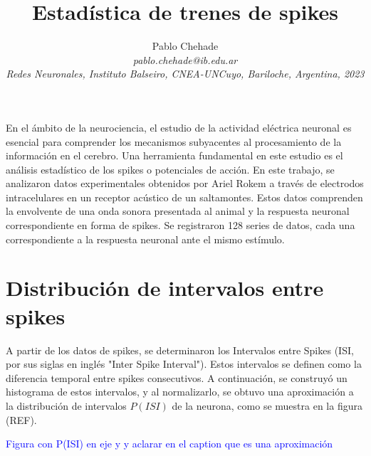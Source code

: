 \documentclass[aps,prb,twocolumn,superscriptaddress,floatfix,longbibliography]{revtex4-2}
\newcounter{para}
\begin{document}
\newcommand{\mytitle}{Estadística de trenes de spikes}

\title{\mytitle}

\author{Pablo Chehade \\
    \small \textit{pablo.chehade@ib.edu.ar} \\
    \small \textit{Redes Neuronales, Instituto Balseiro, CNEA-UNCuyo, Bariloche, Argentina, 2023} \\}
    
    
    
\maketitle

En el ámbito de la neurociencia, el estudio de la actividad eléctrica neuronal es esencial para comprender los mecanismos subyacentes al procesamiento de la información en el cerebro. Una herramienta fundamental en este estudio es el análisis estadístico de los spikes o potenciales de acción. En este trabajo, se analizaron datos experimentales obtenidos por Ariel Rokem a través de electrodos intracelulares en un receptor acústico de un saltamontes. Estos datos comprenden la envolvente de una onda sonora presentada al animal y la respuesta neuronal correspondiente en forma de spikes. Se registraron 128 series de datos, cada una correspondiente a la respuesta neuronal ante el mismo estímulo.

\section{Distribución de intervalos entre spikes}

A partir de los datos de spikes, se determinaron los Intervalos entre Spikes (ISI, por sus siglas en inglés "Inter Spike Interval"). Estos intervalos se definen como la diferencia temporal entre spikes consecutivos. A continuación, se construyó un histograma de estos intervalos, y al normalizarlo, se obtuvo una aproximación a la distribución de intervalos \(P(ISI)\) de la neurona, como se muestra en la figura (REF).

\textcolor{blue}{Figura con P(ISI) en eje y y aclarar en el caption que es una aproximación}
\end{document}
